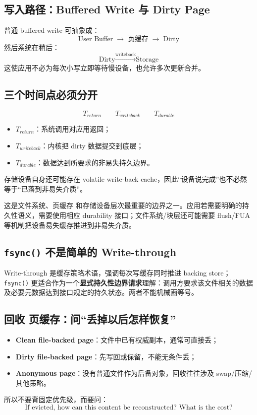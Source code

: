 \documentclass[UTF8,fontset=fandol,11pt,a4paper]{ctexart}
\newcommand{\kw}[1]{\textbf{#1}}
\newcommand{\code}[1]{\texttt{#1}}
\newcommand{\arr}{\;\longrightarrow\;}
\begin{document}
\subsection{写入路径：Buffered Write 与 Dirty Page}
普通 buffered write 可抽象成：
\[
\text{User Buffer}\arr\text{页缓存}\arr\text{Dirty}
\]
然后系统在稍后：
\[
\text{Dirty}\xrightarrow{\text{writeback}}\text{Storage}
\]
这使应用不必为每次小写立即等待慢设备，也允许多次更新合并。

\subsection{三个时间点必须分开}
\[
\boxed{T_{return}}
\qquad
\boxed{T_{writeback}}
\qquad
\boxed{T_{durable}}
\]
\begin{itemize}
  \item $T_{return}$：系统调用对应用返回；
  \item $T_{writeback}$：内核把 dirty 数据提交到底层；
  \item $T_{durable}$：数据达到所要求的非易失持久边界。
\end{itemize}
存储设备自身还可能存在 volatile write-back cache，因此“设备说完成”也不必然等于“已落到非易失介质”。

\begin{warn}[\code{write()} 成功返回不等于持久化完成]
这是文件系统、页缓存 和存储设备层次最重要的边界之一。应用若需要明确的持久性语义，需要使用相应 durability 接口；文件系统/块层还可能需要 flush/FUA 等机制把设备易失缓存推进到非易失介质。
\end{warn}

\subsection{\texorpdfstring{\code{fsync()}}{fsync()} 不是简单的 Write-through}
Write-through 是缓存策略术语，强调每次写缓存同时推进 backing store；\code{fsync()} 更适合作为一个\kw{显式持久性边界请求}理解：调用方要求该文件相关的数据及必要元数据达到接口规定的持久状态。两者不能机械画等号。

\subsection{回收 页缓存：问“丢掉以后怎样恢复”}
\begin{itemize}
  \item \kw{Clean file-backed page}：文件中已有权威副本，通常可直接丢；
  \item \kw{Dirty file-backed page}：先写回或保留，不能无条件丢；
  \item \kw{Anonymous page}：没有普通文件作为后备对象，回收往往涉及 swap/压缩/其他策略。
\end{itemize}
所以不要背固定优先级，而要问：
\[
\boxed{\text{If evicted, how can this content be reconstructed? What is the cost?}}
\]
\end{document}

